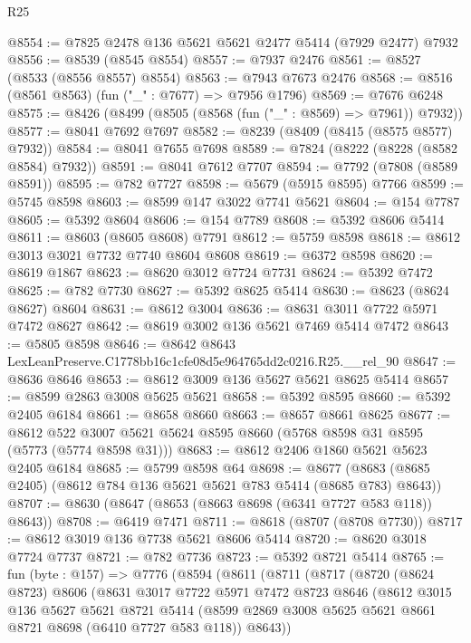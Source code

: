 \begin{lexlean}{R25}
\begin{coremodule}
@8554 := @7825 @2478 @136 @5621 @5621 @2477 @5414 (@7929 @2477) @7932
@8556 := @8539 (@8545 @8554)
@8557 := @7937 @2476
@8561 := @8527 (@8533 (@8556 @8557) @8554)
@8563 := @7943 @7673 @2476
@8568 := @8516 (@8561 @8563) (fun ("_" : @7677) => @7956 @1796)
@8569 := @7676 @6248
@8575 := @8426 (@8499 (@8505 (@8568 (fun ("_" : @8569) => @7961)) @7932))
@8577 := @8041 @7692 @7697
@8582 := @8239 (@8409 (@8415 (@8575 @8577) @7932))
@8584 := @8041 @7655 @7698
@8589 := @7824 (@8222 (@8228 (@8582 @8584) @7932))
@8591 := @8041 @7612 @7707
@8594 := @7792 (@7808 (@8589 @8591))
@8595 := @782 @7727
@8598 := @5679 (@5915 @8595) @7766
@8599 := @5745 @8598
@8603 := @8599 @147 @3022 @7741 @5621
@8604 := @154 @7787
@8605 := @5392 @8604
@8606 := @154 @7789
@8608 := @5392 @8606 @5414
@8611 := @8603 (@8605 @8608) @7791
@8612 := @5759 @8598
@8618 := @8612 @3013 @3021 @7732 @7740 @8604 @8608
@8619 := @6372 @8598
@8620 := @8619 @1867
@8623 := @8620 @3012 @7724 @7731
@8624 := @5392 @7472
@8625 := @782 @7730
@8627 := @5392 @8625 @5414
@8630 := @8623 (@8624 @8627) @8604
@8631 := @8612 @3004
@8636 := @8631 @3011 @7722 @5971 @7472 @8627
@8642 := @8619 @3002 @136 @5621 @7469 @5414 @7472
@8643 := @5805 @8598
@8646 := @8642 @8643 LexLeanPreserve.C1778bb16c1cfe08d5e964765dd2c0216.R25.__rel_90
@8647 := @8636 @8646
@8653 := @8612 @3009 @136 @5627 @5621 @8625 @5414
@8657 := @8599 @2863 @3008 @5625 @5621
@8658 := @5392 @8595
@8660 := @5392 @2405 @6184
@8661 := @8658 @8660
@8663 := @8657 @8661 @8625
@8677 := @8612 @522 @3007 @5621 @5624 @8595 @8660 (@5768 @8598 @31 @8595 (@5773 (@5774 @8598 @31)))
@8683 := @8612 @2406 @1860 @5621 @5623 @2405 @6184
@8685 := @5799 @8598 @64
@8698 := @8677 (@8683 (@8685 @2405) (@8612 @784 @136 @5621 @5621 @783 @5414 (@8685 @783) @8643))
@8707 := @8630 (@8647 (@8653 (@8663 @8698 (@6341 @7727 @583 @118)) @8643))
@8708 := @6419 @7471
@8711 := @8618 (@8707 (@8708 @7730))
@8717 := @8612 @3019 @136 @7738 @5621 @8606 @5414
@8720 := @8620 @3018 @7724 @7737
@8721 := @782 @7736
@8723 := @5392 @8721 @5414
@8765 := fun (byte : @157) =>
  @7776
    (@8594
      (@8611
        (@8711
          (@8717
            (@8720
              (@8624 @8723)
              @8606
              (@8631
                @3017
                @7722
                @5971
                @7472
                @8723
                @8646
                (@8612
                  @3015
                  @136
                  @5627
                  @5621
                  @8721
                  @5414
                  (@8599 @2869 @3008 @5625 @5621 @8661 @8721 @8698 (@6410 @7727 @583 @118))
                  @8643))

\end{coremodule}
\end{lexlean}
